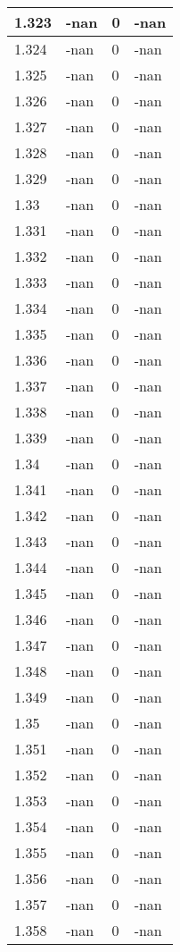 \documentclass[a4paper,14pt]{extarticle}
\begin{document}
\begin{longtable}{||m{3cm}||m{3cm}|m{3cm}||m{3cm}||}
\hline
1.323 & -nan & 0 & -nan\\
\hline
1.324 & -nan & 0 & -nan\\
\hline
1.325 & -nan & 0 & -nan\\
\hline
1.326 & -nan & 0 & -nan\\
\hline
1.327 & -nan & 0 & -nan\\
\hline
1.328 & -nan & 0 & -nan\\
\hline
1.329 & -nan & 0 & -nan\\
\hline
1.33 & -nan & 0 & -nan\\
\hline
1.331 & -nan & 0 & -nan\\
\hline
1.332 & -nan & 0 & -nan\\
\hline
1.333 & -nan & 0 & -nan\\
\hline
1.334 & -nan & 0 & -nan\\
\hline
1.335 & -nan & 0 & -nan\\
\hline
1.336 & -nan & 0 & -nan\\
\hline
1.337 & -nan & 0 & -nan\\
\hline
1.338 & -nan & 0 & -nan\\
\hline
1.339 & -nan & 0 & -nan\\
\hline
1.34 & -nan & 0 & -nan\\
\hline
1.341 & -nan & 0 & -nan\\
\hline
1.342 & -nan & 0 & -nan\\
\hline
1.343 & -nan & 0 & -nan\\
\hline
1.344 & -nan & 0 & -nan\\
\hline
1.345 & -nan & 0 & -nan\\
\hline
1.346 & -nan & 0 & -nan\\
\hline
1.347 & -nan & 0 & -nan\\
\hline
1.348 & -nan & 0 & -nan\\
\hline
1.349 & -nan & 0 & -nan\\
\hline
1.35 & -nan & 0 & -nan\\
\hline
1.351 & -nan & 0 & -nan\\
\hline
1.352 & -nan & 0 & -nan\\
\hline
1.353 & -nan & 0 & -nan\\
\hline
1.354 & -nan & 0 & -nan\\
\hline
1.355 & -nan & 0 & -nan\\
\hline
1.356 & -nan & 0 & -nan\\
\hline
1.357 & -nan & 0 & -nan\\
\hline
1.358 & -nan & 0 & -nan\\

\end{longtable}
\end{document}
